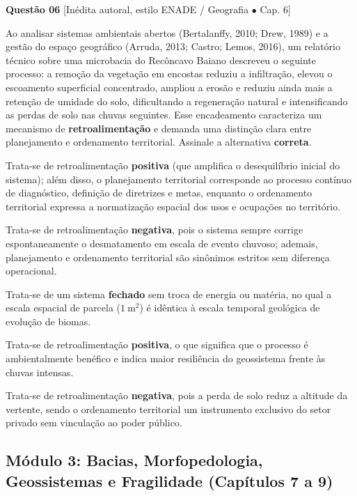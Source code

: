 \vspace{6pt}
\noindent\textbf{Questão 06} {\footnotesize\color{uefsMuted}[Inédita autoral, estilo ENADE / Geografia $\bullet$ Cap. 6]}\par
Ao analisar sistemas ambientais abertos (Bertalanffy, 2010; Drew, 1989) e a gestão do espaço geográfico (Arruda, 2013; Castro; Lemos, 2016), um relatório técnico sobre uma microbacia do Recôncavo Baiano descreveu o seguinte processo: a remoção da vegetação em encostas reduziu a infiltração, elevou o escoamento superficial concentrado, ampliou a erosão e reduziu ainda mais a retenção de umidade do solo, dificultando a regeneração natural e intensificando as perdas de solo nas chuvas seguintes. Esse encadeamento caracteriza um mecanismo de \textbf{retroalimentação} e demanda uma distinção clara entre planejamento e ordenamento territorial. Assinale a alternativa \textbf{correta}.
\begin{alternativas}
  \item Trata-se de retroalimentação \textbf{positiva} (que amplifica o desequilíbrio inicial do sistema); além disso, o planejamento territorial corresponde ao processo contínuo de diagnóstico, definição de diretrizes e metas, enquanto o ordenamento territorial expressa a normatização espacial dos usos e ocupações no território.
  \item Trata-se de retroalimentação \textbf{negativa}, pois o sistema sempre corrige espontaneamente o desmatamento em escala de evento chuvoso; ademais, planejamento e ordenamento territorial são sinônimos estritos sem diferença operacional.
  \item Trata-se de um sistema \textbf{fechado} sem troca de energia ou matéria, no qual a escala espacial de parcela ($1\ \text{m}^2$) é idêntica à escala temporal geológica de evolução de biomas.
  \item Trata-se de retroalimentação \textbf{positiva}, o que significa que o processo é ambientalmente benéfico e indica maior resiliência do geossistema frente às chuvas intensas.
  \item Trata-se de retroalimentação \textbf{negativa}, pois a perda de solo reduz a altitude da vertente, sendo o ordenamento territorial um instrumento exclusivo do setor privado sem vinculação ao poder público.
\end{alternativas}

\subsection*{Módulo 3: Bacias, Morfopedologia, Geossistemas e Fragilidade (Capítulos 7 a 9)}

